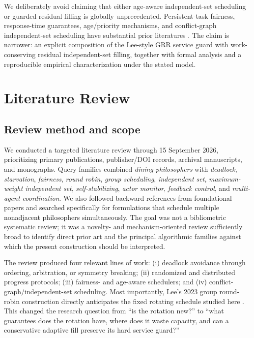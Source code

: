 \documentclass[10pt,journal]{IEEEtran}
\begin{document}
We deliberately avoid claiming that either age-aware independent-set scheduling or guarded residual filling is globally unprecedented. Persistent-task fairness, response-time guarantees, age/priority mechanisms, and conflict-graph independent-set scheduling have substantial prior literatures \cite{awerbuch1990,barnoy1998,scholliers2014,paschalidis2015}. The claim is narrower: an explicit composition of the Lee-style GRR service guard with work-conserving residual independent-set filling, together with formal analysis and a reproducible empirical characterization under the stated model.

\section{Literature Review}
\subsection{Review method and scope}
We conducted a targeted literature review through 15 September 2026, prioritizing primary publications, publisher/DOI records, archival manuscripts, and monographs. Query families combined \emph{dining philosophers} with \emph{deadlock}, \emph{starvation}, \emph{fairness}, \emph{round robin}, \emph{group scheduling}, \emph{independent set}, \emph{maximum-weight independent set}, \emph{self-stabilizing}, \emph{actor monitor}, \emph{feedback control}, and \emph{multi-agent coordination}. We also followed backward references from foundational papers and searched specifically for formulations that schedule multiple nonadjacent philosophers simultaneously. The goal was not a bibliometric systematic review; it was a novelty- and mechanism-oriented review sufficiently broad to identify direct prior art and the principal algorithmic families against which the present construction should be interpreted.

The review produced four relevant lines of work: (i) deadlock avoidance through ordering, arbitration, or symmetry breaking; (ii) randomized and distributed progress protocols; (iii) fairness- and age-aware schedulers; and (iv) conflict-graph/independent-set scheduling. Most importantly, Lee's 2023 group round-robin construction directly anticipates the fixed rotating schedule studied here \cite{lee2023}. This changed the research question from ``is the rotation new?'' to ``what guarantees does the rotation have, where does it waste capacity, and can a conservative adaptive fill preserve its hard service guard?''
\end{document}
